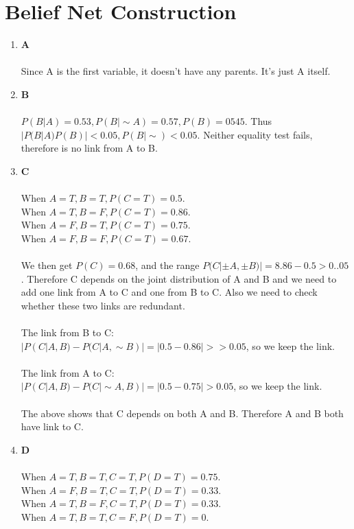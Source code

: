 \documentclass[english]{article}
\begin{document}
\section{Belief Net Construction}
\begin{enumerate}
    \item \textbf{A}\\\\
    Since A is the first variable, it doesn't have any parents. It's just A itself.
    \item \textbf{B}\\\\
    $P(B|A)=0.53, P(B|\sim A)=0.57, P(B)=0545$. Thus $|P(B|A)P(B)|<0.05, P(B|\sim )<0.05$. Neither equality test fails, therefore is no link from A to B.
    \item \textbf{C}\\\\
    When $A=T, B=T, P(C=T)=0.5$.\\
    When $A=T, B=F, P(C=T)=0.86$.\\
    When $A=F, B=T, P(C=T)=0.75$.\\
    When $A=F, B=F, P(C=T)=0.67$.\\\\
    We then get $P(C)=0.68$, and the range $P(C|\pm A, \pm B)| = 8.86-0.5>0..05$. Therefore C depends on the joint distribution of A and B and we need to add one link from A to C and one from B to C. Also we need to check whether these two links are redundant.\\\\
    The link from B to C:\\
    $|P(C|A,B)-P(C|A,\sim B)| = |0.5-0.86|>>0.05$, so we keep the link.\\\\
    The link from A to C:\\
    $|P(C|A,B)-P(C|\sim A, B)| = |0.5-0.75|>0.05$, so we keep the link.\\\\
    The above shows that C depends on both A and B. Therefore A and B both have link to C.
    \item \textbf{D}\\\\
    When $A=T, B=T, C=T, P(D=T)=0.75$.\\
    When $A=F, B=T, C=T, P(D=T)=0.33$.\\
    When $A=T, B=F, C=T, P(D=T)=0.33$.\\
    When $A=T, B=T, C=F, P(D=T)=0$.\\

\end{enumerate}
\end{document}
